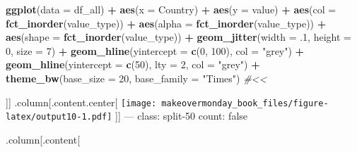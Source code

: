 \documentclass[]{book}
\newenvironment{Shaded}{\begin{snugshade}}{\end{snugshade}}
\newcommand{\KeywordTok}[1]{\textcolor[rgb]{0.13,0.29,0.53}{\textbf{#1}}}
\newcommand{\DataTypeTok}[1]{\textcolor[rgb]{0.13,0.29,0.53}{#1}}
\newcommand{\DecValTok}[1]{\textcolor[rgb]{0.00,0.00,0.81}{#1}}
\newcommand{\StringTok}[1]{\textcolor[rgb]{0.31,0.60,0.02}{#1}}
\newcommand{\CommentTok}[1]{\textcolor[rgb]{0.56,0.35,0.01}{\textit{#1}}}
\newcommand{\OperatorTok}[1]{\textcolor[rgb]{0.81,0.36,0.00}{\textbf{#1}}}
\newcommand{\NormalTok}[1]{#1}
\theoremstyle{definition}
\theoremstyle{definition}
\theoremstyle{definition}
\theoremstyle{remark}
\begin{document}
\begin{Shaded}
\begin{Highlighting}[]
\KeywordTok{ggplot}\NormalTok{(}\DataTypeTok{data =}\NormalTok{ df_all) }\OperatorTok{+}
\StringTok{  }\KeywordTok{aes}\NormalTok{(}\DataTypeTok{x =}\NormalTok{ Country) }\OperatorTok{+}
\StringTok{  }\KeywordTok{aes}\NormalTok{(}\DataTypeTok{y =}\NormalTok{ value) }\OperatorTok{+}
\StringTok{  }\KeywordTok{aes}\NormalTok{(}\DataTypeTok{col =} \KeywordTok{fct_inorder}\NormalTok{(value_type)) }\OperatorTok{+}
\StringTok{  }\KeywordTok{aes}\NormalTok{(}\DataTypeTok{alpha =} \KeywordTok{fct_inorder}\NormalTok{(value_type)) }\OperatorTok{+}
\StringTok{  }\KeywordTok{aes}\NormalTok{(}\DataTypeTok{shape =} \KeywordTok{fct_inorder}\NormalTok{(value_type)) }\OperatorTok{+}
\StringTok{  }\KeywordTok{geom_jitter}\NormalTok{(}\DataTypeTok{width =}\NormalTok{ .}\DecValTok{1}\NormalTok{, }\DataTypeTok{height =} \DecValTok{0}\NormalTok{, }\DataTypeTok{size =} \DecValTok{7}\NormalTok{) }\OperatorTok{+}
\StringTok{  }\KeywordTok{geom_hline}\NormalTok{(}\DataTypeTok{yintercept =} \KeywordTok{c}\NormalTok{(}\DecValTok{0}\NormalTok{, }\DecValTok{100}\NormalTok{), }\DataTypeTok{col =} \StringTok{"grey"}\NormalTok{) }\OperatorTok{+}
\StringTok{  }\KeywordTok{geom_hline}\NormalTok{(}\DataTypeTok{yintercept =} \KeywordTok{c}\NormalTok{(}\DecValTok{50}\NormalTok{), }\DataTypeTok{lty =} \DecValTok{2}\NormalTok{, }\DataTypeTok{col =} \StringTok{"grey"}\NormalTok{) }\OperatorTok{+}
\StringTok{  }\KeywordTok{theme_bw}\NormalTok{(}\DataTypeTok{base_size =} \DecValTok{20}\NormalTok{, }\DataTypeTok{base_family =} \StringTok{"Times"}\NormalTok{)  }\CommentTok{#<<}
\end{Highlighting}
\end{Shaded}

{]}{]} .column{[}.content.center{[}
\texttt{[image: makeovermonday\_book\_files/figure-latex/output10-1.pdf]}
{]}{]} --- class: split-50 count: false

.column{[}.content{[}
\end{document}
